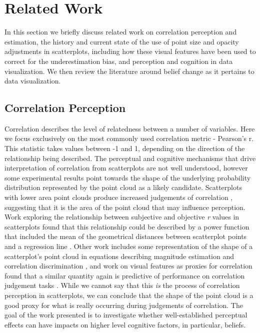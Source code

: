 \documentclass[manuscript,screen,review,anonymous]{acmart}
\begin{document}
\section{Related Work}\label{sec-rel-work-main}

In this section we briefly discuss related work on correlation
perception and estimation, the history and current state of the use of
point size and opacity adjustments in scatterplots, including how these
visual features have been used to correct for the underestimation bias,
and perception and cognition in data visualization. We then review the
literature around belief change as it pertains to data visualization.

\subsection{Correlation Perception}\label{sec-corr-percept}

Correlation describes the level of relatedness between a number of
variables. Here we focus exclusively on the most commonly used
correlation metric - Pearson's r. This statistic takes values between -1
and 1, depending on the direction of the relationship being described.
The perceptual and cognitive mechanisms that drive interpretation of
correlation from scatterplots are not well understood, however some
experimental results point towards the shape of the underlying
probability distribution represented by the point cloud as a likely
candidate. Scatterplots with lower area point clouds produce increased
judgements of correlation \citep{cleveland_1982}, suggesting that it is
the area of the point cloud that may influence perception. Work
exploring the relationship between subjective and objective \emph{r}
values in scatterplots found that this relationship could be described
by a power function that included the mean of the geometrical distances
between scatterplot points and a regression line \citep{meyer_1997}.
Other work includes some representation of the shape of a scatterplot's
point cloud in equations describing magnitude estimation and correlation
discrimination \citep{meyer_1997, rensink_2017}, and work on visual
features as proxies for correlation found that a similar quantity again
is predictive of performance on correlation judgement tasks
\citep{yang_2019}. While we cannot say that this \emph{is} the process
of correlation perception in scatterplots, we can conclude that the
shape of the point cloud is a good proxy for what is really occurring
during judgements of correlation. The goal of the work presented is to
investigate whether well-established perceptual effects can have impacts
on higher level cognitive factors, in particular, beliefs.
\end{document}
